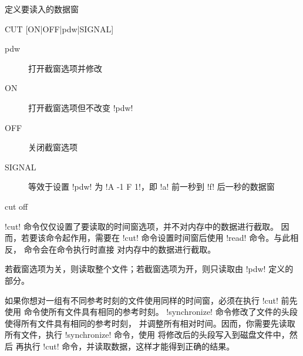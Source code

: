 \label{cmd:cut}

定义要读入的数据窗

\begin{SACSTX}
CUT [ON|OFF|pdw|SIGNAL]
\end{SACSTX}

\begin{description}
\item [pdw] 打开截窗选项并修改 
\item [ON] 打开截窗选项但不改变 !pdw!
\item [OFF] 关闭截窗选项
\item [SIGNAL] 等效于设置 !pdw! 为 !A -1 F 1!，即 !a!
    前一秒到 !f! 后一秒的数据窗
\end{description}

\begin{SACDFT}
cut off
\end{SACDFT}

!cut! 命令仅仅设置了要读取的时间窗选项，并不对内存中的数据进行截取。
因而，若要该命令起作用，需要在 !cut! 命令设置时间窗后使用
!read! 命令。与此相反， 命令会在命令执行时直接
对内存中的数据进行截取。

若截窗选项为关，则读取整个文件；若截窗选项为开，则只读取由 !pdw!
定义的部分。

如果你想对一组有不同参考时刻的文件使用同样的时间窗，必须在执行 !cut!
前先使用  命令使所有文件具有相同的参考时刻。
!synchronize! 命令修改了文件的头段使得所有文件具有相同的参考时刻，
并调整所有相对时间。因而，你需要先读取所有文件，执行 !synchronize!
命令，使用  将修改后的头段写入到磁盘文件中，然后
再执行 !cut! 命令，并读取数据，这样才能得到正确的结果。

